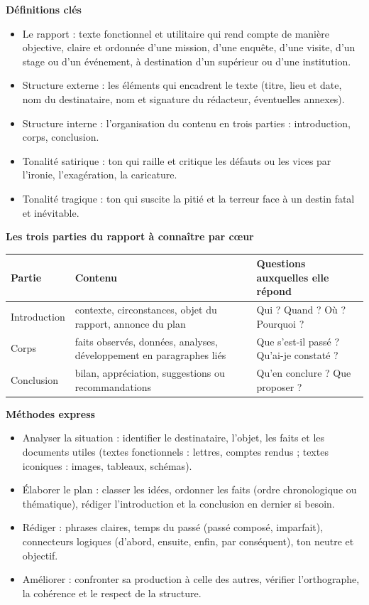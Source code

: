 \documentclass[11pt]{article}
\newcommand{\cle}[1]{{\popxbold\color{popdark}#1}}
\begin{document}
\begin{bilan}
\textbf{Définitions clés}
\begin{itemize}
\item Le \cle{rapport} : texte fonctionnel et utilitaire qui rend compte de manière objective, claire et ordonnée d'une mission, d'une enquête, d'une visite, d'un stage ou d'un événement, à destination d'un supérieur ou d'une institution.
\item \cle{Structure externe} : les éléments qui encadrent le texte (titre, lieu et date, nom du destinataire, nom et signature du rédacteur, éventuelles annexes).
\item \cle{Structure interne} : l'organisation du contenu en trois parties : introduction, corps, conclusion.
\item Tonalité \cle{satirique} : ton qui raille et critique les défauts ou les vices par l'ironie, l'exagération, la caricature.
\item Tonalité \cle{tragique} : ton qui suscite la pitié et la terreur face à un destin fatal et inévitable.
\end{itemize}

\textbf{Les trois parties du rapport à connaître par cœur}
\begin{center}
\begin{tabularx}{\linewidth}{|l|X|X|}
\hline
\rowcolor{popblueL} \textbf{Partie} & \textbf{Contenu} & \textbf{Questions auxquelles elle répond} \\
\hline
Introduction & contexte, circonstances, objet du rapport, annonce du plan & Qui ? Quand ? Où ? Pourquoi ? \\
\hline
Corps & faits observés, données, analyses, développement en paragraphes liés & Que s'est-il passé ? Qu'ai-je constaté ? \\
\hline
Conclusion & bilan, appréciation, suggestions ou recommandations & Qu'en conclure ? Que proposer ? \\
\hline
\end{tabularx}
\end{center}

\textbf{Méthodes express}
\begin{itemize}
\item \cle{Analyser la situation} : identifier le destinataire, l'objet, les faits et les documents utiles (textes fonctionnels : lettres, comptes rendus ; textes iconiques : images, tableaux, schémas).
\item \cle{Élaborer le plan} : classer les idées, ordonner les faits (ordre chronologique ou thématique), rédiger l'introduction et la conclusion en dernier si besoin.
\item \cle{Rédiger} : phrases claires, temps du passé (passé composé, imparfait), connecteurs logiques (d'abord, ensuite, enfin, par conséquent), ton neutre et objectif.
\item \cle{Améliorer} : confronter sa production à celle des autres, vérifier l'orthographe, la cohérence et le respect de la structure.
\end{itemize}
\end{bilan}
\end{document}
